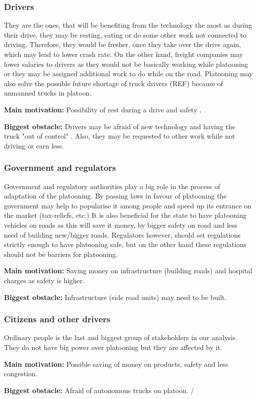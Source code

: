 \subsubsection*{Drivers}
% 
They are the ones, that will be benefiting from the technology the most as during their drive, they may be resting, eating or do some other work not connected to driving. Therefore, they would be fresher, once they take over the drive again, which may lead to lower crash rate. On the other hand, freight companies may lower salaries to drivers as they would not be basically working while platooning or they may be assigned additional work to do while on the road. Platooning may also solve the possible future shortage of truck drivers (REF) because of unmanned trucks in platoon.\par
% 
\par \textbf{Main motivation:} Possibility of rest during a drive and safety \cite[p. 37]{Chan2012ProjectSARTRE}.\par
% 
\par \textbf{Biggest obstacle:} Drivers may be afraid of new technology and having the truck "out of control" \cite{Sadeghian2016CooperativePrototype}. Also, they may be requested to other work while not driving or earn less.\par
% 
\subsubsection*{Government and regulators}
% 
Government and regulatory authorities play a big role in the process of adaptation of the platooning. By passing laws in favour of platooning the government may help to popularise it among people and speed up its entrance on the market (tax-reliefs, etc.) It is also beneficial for the state to have platooning vehicles on roads as this will save it money, by bigger safety on road and less need of building new/bigger roads. Regulators however, should set regulations strictly enough to have platooning safe, but on the other hand these regulations should not be barriers for platooning.
% 
\par \textbf{Main motivation:} Saving money on infrastructure (building roads) and hospital charges as safety is higher\cite[p. 37]{Chan2012ProjectSARTRE}.
% 
\par \textbf{Biggest obstacle:} Infrastructure (side road units) may need to be built.\par
% 
\subsubsection*{Citizens and other drivers}
% 
Ordinary people is the last and biggest group of stakeholders in our analysis. They do not have big power over platooning but they are affected by it.
% 
\par \textbf{Main motivation:} Possible saving of money on products, safety and less congestion.\par
% 
\par \textbf{Biggest obstacle:} Afraid of autonomous trucks on platoon. /
